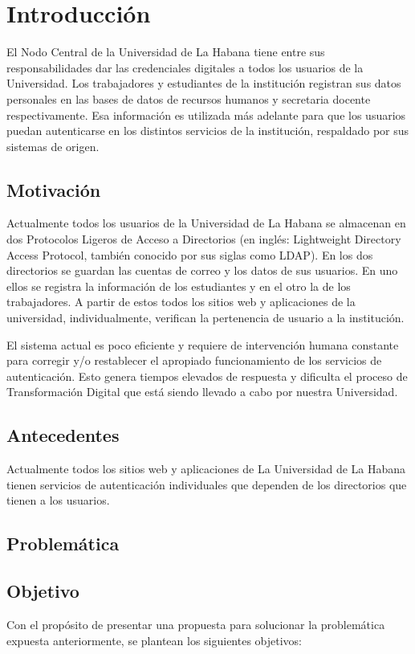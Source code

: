 \chapter*{Introducción}\label{chapter:introduction}
El Nodo Central de la Universidad de La Habana tiene entre sus responsabilidades dar  las credenciales  digitales a todos los usuarios de la Universidad. Los trabajadores y estudiantes de la instituci\'on registran sus datos personales en las bases de datos de recursos humanos y secretaria docente respectivamente. Esa informaci\'on  es utilizada m\'as adelante para que los usuarios puedan autenticarse en los distintos servicios de la institución, respaldado por sus sistemas de origen. 


\section*{Motivación}
Actualmente todos los usuarios de la Universidad de La Habana se almacenan en dos Protocolos Ligeros de Acceso a Directorios (en inglés: Lightweight Directory Access Protocol, también conocido por sus siglas como LDAP). En los dos directorios se guardan las cuentas de correo y los datos de sus usuarios. En uno ellos se registra la información de los estudiantes y en el otro la de los trabajadores. A partir de estos todos los sitios web y aplicaciones de la universidad, individualmente, verifican la pertenencia de usuario a la institución.

El sistema actual es poco eficiente y requiere de intervención humana constante para corregir y/o restablecer el apropiado funcionamiento de los servicios de autenticación. Esto genera tiempos elevados de respuesta y dificulta el proceso de Transformación Digital que está siendo llevado a cabo por nuestra Universidad.

\section*{Antecedentes}
Actualmente todos los sitios web y aplicaciones de La Universidad de La Habana tienen servicios de autenticación individuales que dependen de los directorios que tienen a los usuarios.

\section*{Problemática}

\section*{Objetivo}
Con el propósito de presentar una propuesta para solucionar la problemática expuesta anteriormente, se plantean los siguientes objetivos:

